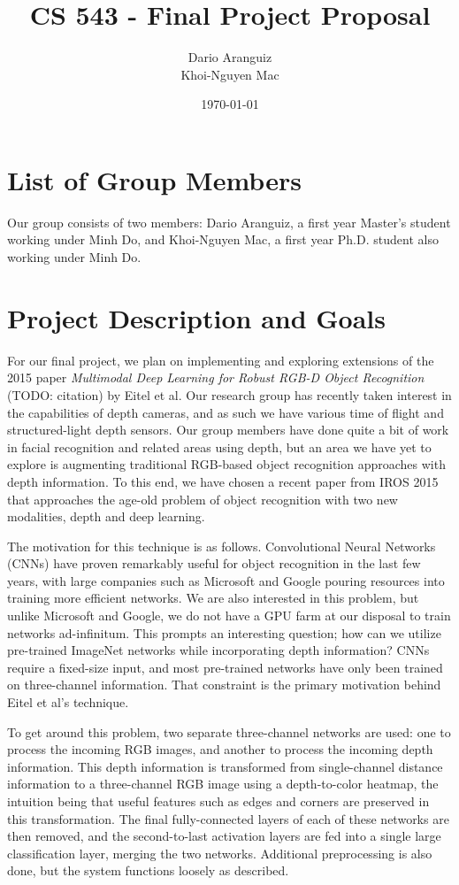 \documentclass[paper=letter, fontsize=12pt]{article}
\title{CS 543 - Final Project Proposal}
\author{
        Dario Aranguiz \\
        Khoi-Nguyen Mac
        }
\date{\today}
\begin{document}
\maketitle

\section{List of Group Members}

Our group consists of two members: Dario Aranguiz, a first year Master's
student working under Minh Do, and Khoi-Nguyen Mac, a first year Ph.D. student
also working under Minh Do.


\section{Project Description and Goals}

For our final project, we plan on implementing and exploring extensions of the
2015 paper \textit{Multimodal Deep Learning for Robust RGB-D Object
Recognition} (TODO: citation) by Eitel et al. Our research group has recently
taken interest in the capabilities of depth cameras, and as such we have
various time of flight and structured-light depth sensors. Our group members
have done quite a bit of work in facial recognition and related areas using
depth, but an area we have yet to explore is augmenting traditional RGB-based
object recognition approaches with depth information. To this end, we have
chosen a recent paper from IROS 2015 that approaches the age-old problem of
object recognition with two new modalities, depth and deep learning.

The motivation for this technique is as follows. Convolutional Neural Networks
(CNNs) have proven remarkably useful for object recognition in the last few
years, with large companies such as Microsoft and Google pouring resources
into training more efficient networks. We are also interested in this problem,
but unlike Microsoft and Google, we do not have a GPU farm at our disposal to
train networks ad-infinitum. This prompts an interesting question; how can we
utilize pre-trained ImageNet networks while incorporating depth information?
CNNs require a fixed-size input, and most pre-trained networks have only been
trained on three-channel information. That constraint is the primary
motivation behind Eitel et al's technique.

To get around this problem, two separate three-channel networks are used: one
to process the incoming RGB images, and another to process the incoming depth
information. This depth information is transformed from single-channel
distance information to a three-channel RGB image using a depth-to-color
heatmap, the intuition being that useful features such as edges and corners
are preserved in this transformation. The final fully-connected layers of each
of these networks are then removed, and the second-to-last activation layers
are fed into a single large classification layer, merging the two networks.
Additional preprocessing is also done, but the system functions loosely as
described.
\end{document}
